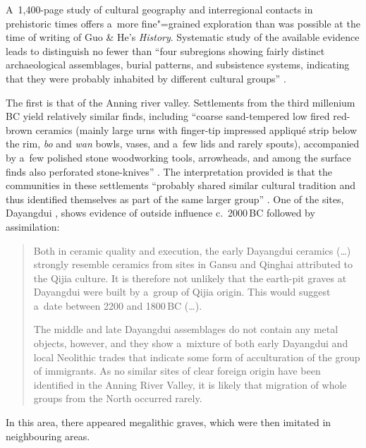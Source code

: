 A~1,400-page study of cultural geography and interregional contacts in prehistoric times offers a~more fine"=grained exploration than was possible at the time of writing of Guo \& He's \textit{History}. Systematic study of the available evidence leads to distinguish no fewer than “four subregions
showing fairly distinct archaeological assemblages, burial patterns, and subsistence
systems, indicating that they were probably inhabited by different cultural groups” \citep[588]{hein2013}. 

The first is that of the Anning river  valley. Settlements from the third millenium\,BC yield relatively similar finds, including “coarse sand-tempered low fired red-brown ceramics (mainly large urns with finger-tip impressed appliqué strip below the rim, \textit{bo} and \textit{wan} bowls, vases, and a~few lids and rarely spouts), accompanied by a~few polished stone woodworking tools, arrowheads, and among the surface finds also perforated
stone-knives” \citep[559]{hein2013}. The interpretation provided is that the communities in these settlements “probably shared
similar cultural tradition and thus identified themselves as part of the same larger group” \citep[589]{hein2013}. One of the sites, Dayangdui , shows evidence of outside influence c.~2000\,BC followed by {assimilation}: 

\begin{quotation}
	Both in ceramic quality and
	execution, the early Dayangdui ceramics ({\dots}) strongly resemble ceramics from sites in 
	Gansu  and Qinghai  attributed to the Qijia  culture. It is therefore not
	unlikely that the earth-pit graves at Dayangdui were built by a~group of Qijia origin. This would
	suggest a~date between 2200 and 1800\,BC ({\dots}). \citep[562]{hein2013}
	
	The middle and late Dayangdui assemblages do not contain any metal objects, however,
	and they show a~mixture of both early Dayangdui and local Neolithic trades that indicate some
	form of acculturation of the group of immigrants. As no similar sites of clear foreign origin have
	been identified in the Anning River Valley, it is likely that migration of whole groups from the
	North occurred rarely. \citep[594]{hein2013}
\end{quotation}	

{\noindent}In this area, there appeared megalithic graves, which were then imitated in neighbouring areas. 	

